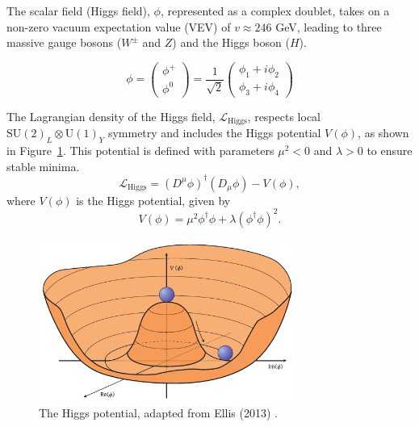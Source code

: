 The scalar field (Higgs field), $\phi$, represented as a complex doublet, takes on a non-zero vacuum expectation value (VEV) of $v \approx 246$ GeV, leading to three massive gauge bosons ($W^{\pm}$ and $Z$) and the Higgs boson ($H$).

\begin{equation}
\phi =
\begin{pmatrix}
\phi^+ \\
\phi^0
\end{pmatrix}
=
\frac{1}{\sqrt{2}}
\begin{pmatrix}
\phi_1 + i\phi_2 \\
\phi_3 + i\phi_4
\end{pmatrix}
\end{equation}



The Lagrangian density of the Higgs field, $\mathcal{L}_\text{Higgs}$, respects local $\mathrm{SU}(2)_L \otimes \mathrm{U}(1)_Y$ symmetry and includes the Higgs potential $V(\phi)$, as shown in Figure~\ref{fig:higgs_potential}. This potential is defined with parameters $\mu^2 < 0$ and $\lambda > 0$ to ensure stable minima. 
\begin{equation}
\mathcal{L}_\text{Higgs} = (D^\mu\phi)^\dagger (D_\mu\phi) - V(\phi),
\end{equation}
where \(V(\phi)\) is the Higgs potential, given by
\begin{equation}
V(\phi) = \mu^2\phi^\dagger\phi + \lambda (\phi^\dagger\phi)^2.
\end{equation}

\begin{figure}[ht]
\centering
\includegraphics[width=0.75\textwidth]{figures/theory/higgspotential.png}
\caption[Higgs Potential]{The Higgs potential, adapted from Ellis (2013) \cite{ellis2013higgs}.}
\label{fig:higgs_potential}
\end{figure}

